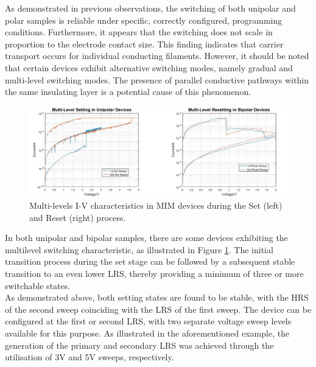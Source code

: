 As demonstrated in previous observations, the switching of both unipolar and polar samples is reliable under specific, correctly configured, programming conditions. Furthermore, it appears that the switching does not scale in proportion to the electrode contact size. This finding indicates that carrier transport occurs for individual conducting filaments. However, it should be noted that certain devices exhibit alternative switching modes, namely gradual and multi-level switching modes. The presence of parallel conductive pathways within the same insulating layer is a potential cause of this phenomenon. \\

\begin{figure}[htbp!] 
    \centering    
    \includegraphics[width=1\textwidth]{Chapter3/Figs/p.png}
    \caption[Multi-levels I-V characteristics in MIM devices.]{Multi-levels I-V characteristics in MIM devices during the Set (left) and Reset (right) process.}
    \label{fig:3p}
\end{figure}

\noindent In both unipolar and bipolar samples, there are some devices exhibiting the multilevel switching characteristic, as illustrated in Figure \ref{fig:3p}. The initial transition process during the set stage can be followed by a subsequent stable transition to an even lower LRS, thereby providing a minimum of three or more switchable states. \\

\noindent As demonstrated above, both setting states are found to be stable, with the HRS of the second sweep coinciding with the LRS of the first sweep. The device can be configured at the first or second LRS, with two separate voltage sweep levels available for this purpose. As illustrated in the aforementioned example, the generation of the primary and secondary LRS was achieved through the utilisation of 3V and 5V sweeps, respectively.\\

